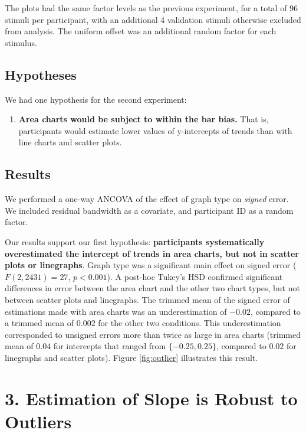\documentclass{sigchi}
\begin{document}
The plots had the same factor levels as the previous experiment, for a total of 96 stimuli per participant, with an additional 4 validation stimuli otherwise excluded from analysis. The uniform offset was an additional random factor for each stimulus.

\subsection{Hypotheses}

We had one hypothesis for the second experiment:
\begin{enumerate}
	\item \textbf{Area charts would be subject to within the bar bias.} That is, participants would estimate lower values of y-intercepts of trends than with line charts and scatter plots.
\end{enumerate}
\subsection{Results}
We performed a one-way ANCOVA of the effect of graph type on \emph{signed} error. We included residual bandwidth as a covariate, and participant ID as a random factor.

Our results support our first hypothesis: \textbf{participants systematically overestimated the intercept of trends in area charts, but not in scatter plots or linegraphs}. Graph type was a significant main effect on signed error ($F(2,2431)=27$, $p<0.001$). A post-hoc Tukey's HSD confirmed significant differences in error between the area chart and the other two chart types, but not between scatter plots and linegraphs. The trimmed mean of the signed error of estimations made with area charts was an underestimation of $-0.02$, compared to a trimmed mean of $0.002$ for the other two conditions. This underestimation corresponded to unsigned errors more than twice as large in area charts (trimmed mean of $0.04$ for intercepts that ranged from $\{-0.25,0.25\}$, compared to $0.02$ for linegraphs and scatter plots). Figure \ref{fig:outlier} illustrates this result.

\section{3. Estimation of Slope is Robust to Outliers}
\end{document}
